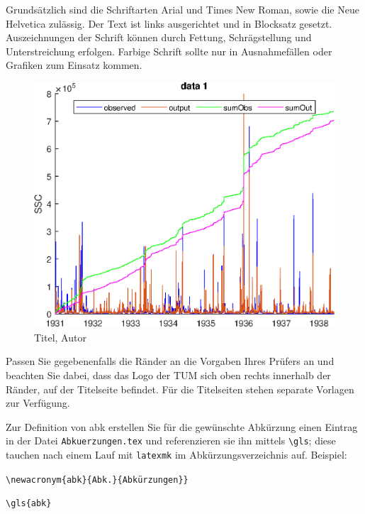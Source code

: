 Grundsätzlich sind die Schriftarten Arial und Times New Roman, sowie die Neue
Helvetica zulässig. Der Text ist links ausgerichtet und in Blocksatz gesetzt.
Auszeichnungen der Schrift können durch Fettung, Schrägstellung und
Unterstreichung erfolgen. Farbige Schrift sollte nur in Ausnahmefällen oder
Grafiken zum Einsatz kommen.

\begin{figure}[!ht]
\noindent\hspace{0.5mm}\includegraphics[width=12cm]{./Ressourcen/epsFig}
\caption{Titel, Autor}
\end{figure}

\clearpage

Passen Sie gegebenenfalls die Ränder an die Vorgaben Ihres Prüfers an und
beachten Sie dabei, dass das Logo der TUM sich oben rechts innerhalb der
Ränder, auf der Titelseite befindet. Für die Titelseiten stehen separate
Vorlagen zur Verfügung.

Zur Definition von \gls{abk} erstellen Sie für die gewünschte Abkürzung einen
Eintrag in der Datei \texttt{Abkuerzungen.tex} und referenzieren sie ihn
mittels \texttt{\textbackslash{}gls}; diese tauchen nach einem Lauf mit
\texttt{latexmk} im Abkürzungsverzeichnis auf. Beispiel:

\vspace{-\baselineskip}
\begin{description}[leftmargin=1em+5mm, labelindent=5mm]
\item[Definition in \texttt{Abkuerzungen.tex}:] \texttt{\textbackslash{}newacronym\{abk\}\{Abk.\}\{Abkürzungen\}\}}
\item[Referenzierung:] \texttt{\textbackslash{}gls\{abk\}}
\end{description}

